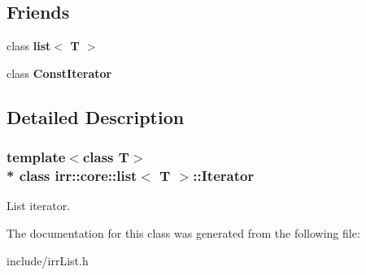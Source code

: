 \subsection*{Friends}
\begin{DoxyCompactItemize}
\item 
class {\bfseries list$<$ T $>$}\hypertarget{classirr_1_1core_1_1list_1_1Iterator_ab6cf03d50c50087700b0fb872accfa7b}{}\label{classirr_1_1core_1_1list_1_1Iterator_ab6cf03d50c50087700b0fb872accfa7b}

\item 
class {\bfseries Const\+Iterator}\hypertarget{classirr_1_1core_1_1list_1_1Iterator_a5485970bb9da6b5d782fa28638b5658f}{}\label{classirr_1_1core_1_1list_1_1Iterator_a5485970bb9da6b5d782fa28638b5658f}

\end{DoxyCompactItemize}


\subsection{Detailed Description}
\subsubsection*{template$<$class T$>$\\*
class irr\+::core\+::list$<$ T $>$\+::\+Iterator}

List iterator. 

The documentation for this class was generated from the following file\+:\begin{DoxyCompactItemize}
\item 
include/irr\+List.\+h\end{DoxyCompactItemize}
